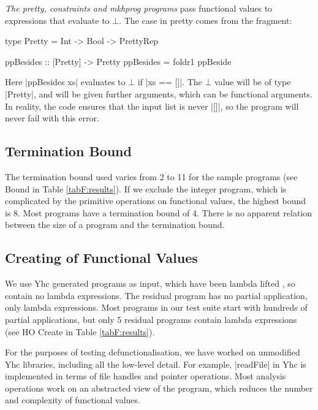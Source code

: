 \begin{example}
\textit{The pretty, constraints and mkhprog programs} pass functional values to expressions that evaluate to $\bot$. The case in pretty comes from the fragment:

\begin{comment}
\begin{code}
data PrettyRep = PrettyRep
ppBeside :: Pretty -> Pretty -> Pretty
\end{code}
\end{comment}
\begin{code}
type Pretty = Int -> Bool -> PrettyRep

ppBesides :: [Pretty] -> Pretty
ppBesides = foldr1 ppBeside
\end{code}

Here |ppBesides xs| evaluates to $\bot$ if |xs == []|. The $\bot$ value will be of type |Pretty|, and will be given further arguments, which can be functional arguments. In reality, the code ensures that the input list is never |[]|, so the program will never fail with this error.
\end{example}

\subsection{Termination Bound}

The termination bound used varies from 2 to 11 for the sample programs (see Bound in Table \ref{tabF:results}). If we exclude the integer program, which is complicated by the primitive operations on functional values, the highest bound is 8. Most programs have a termination bound of 4. There is no apparent relation between the size of a program and the termination bound.

\subsection{Creating of Functional Values}

We use Yhc generated programs as input, which have been lambda lifted \cite{lambda_lift}, so contain no lambda expressions. The residual program has no partial application, only lambda expressions. Most programs in our test suite start with hundreds of partial applications, but only 5 residual programs contain lambda expressions (see HO Create in Table \ref{tabF:results}).

For the purposes of testing defunctionalisation, we have worked on unmodified Yhc libraries, including all the low-level detail. For example, |readFile| in Yhc is implemented in terms of file handles and pointer operations. Most analysis operations work on an abstracted view of the program, which reduces the number and complexity of functional values.


